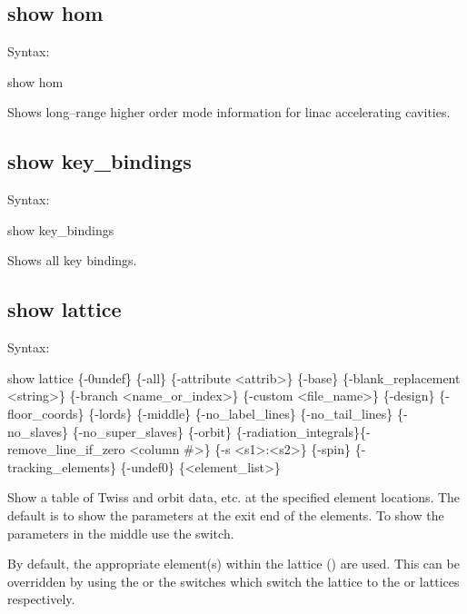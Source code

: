 {{{{{%

\subsection{show hom}
\label{s:show.hom}

Syntax:
\begin{example}
  show hom
\end{example}

Shows long--range higher order mode information for linac accelerating
cavities.


\subsection{show key_bindings}
\label{s:show.key}

Syntax:
\begin{example}
  show key_bindings
\end{example}


Shows all key bindings.


\subsection{show lattice}
\label{s:show.lattice}

Syntax:
\begin{example}
  show lattice \{-0undef\} \{-all\} \{-attribute <attrib>\} \{-base\}
      \{-blank_replacement <string>\}  \{-branch <name_or_index>\}
      \{-custom <file_name>\} \{-design\} \{-floor_coords\} \{-lords\} \{-middle\}
      \{-no_label_lines\} \{-no_tail_lines\} \{-no_slaves\} \{-no_super_slaves\} \{-orbit\} 
      \{-radiation_integrals\}\{-remove_line_if_zero <column \#>\} \{-s <s1>:<s2>\} \{-spin\} 
      \{-tracking_elements\} \{-undef0\} \{<element_list>\} 
\end{example}

Show a table of Twiss and orbit data, etc. at the specified element locations. The default
is to show the parameters at the exit end of the elements. To show the parameters in the
middle use the  switch.

By default, the appropriate element(s) within the  lattice ()
are used. This can be overridden by using the  or the  switches
which switch the lattice to the  or  lattices respectively.

}}}}}
